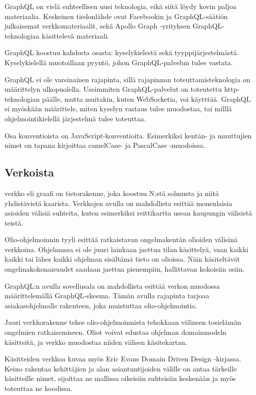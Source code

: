 GraphQL on vielä suhteellisen uusi teknologia, eikä siitä löydy kovin
paljoa materiaalia. Keskeinen tiedonlähde ovat Facebookin ja
GraphQL-säätiön julkaisemat verkkomateriaalit, sekä Apollo Graph
-yrityksen GraphQL-teknologiaa käsittelevä materiaali.

GraphQL koostuu kahdesta osasta: kyselykielestä sekä
tyyppijärjestelmästä. Kyselykielellä muotoillaan pyyntö, johon
GraphQL-palvelun tulee vastata.

GraphQL ei ole varsinainen rajapinta, sillä rajapinnan
toteuttamisteknologia on määrittelyn ulkopuolella. Useimmiten
GraphQL-palvelut on toteutettu \gls{http}-teknologian päälle, mutta
muitakin, kuten WebSocketia, voi käytttää. GraphQL ei myöskään
määrittele, miten kyselyn vastaus tulee muodostaa, tai milllä
ohjelmointikielellä järjestelmä tulee toteuttaa.

Osa konventioista on JavaScript-konventioita. Esimerkiksi kentän- ja
muuttujien nimet on tapana kirjoittaa camelCase- ja PascalCase
-muodoissa.\cite{GraphQLSchemaBasics}

\hypertarget{verkoista}{%
\subsection{Verkoista}\label{verkoista}}

\gls{verkko} eli graafi on tietorakenne, joka koostuu N:stä solmusta ja
niitä yhdistävistä kaarista.\cite{pozrikidis2014introduction} Verkkojen
avulla on mahdollista esittää monenlaisia asioiden välisiä suhteita,
kuten esimerkiksi reittikartta usean kaupungin välisistä teistä.

Olio-ohjelmoinnin tyyli esittää ratkaistavan ongelmakentän olioiden
välisinä verkkoina. Ohjelmassa ei ole juuri lainkaan jaettua tilan
käsittelyä, vaan kaikki kaikki tai lähes kaikki ohjelman sisältämä tieto
on olioissa. Näin käsiteltävät ongelmakokonaisuudet saadaan jaettua
pienempiin, hallittavan kokoisiin osiin. \cite{booch2008object}

GraphQL:n avulla sovellusala on mahdollista esittää verkon muodossa
määrittelemällä GraphQL-skeema. Tämän avulla rajapinta tarjoaa
asiakasohjelmalle rakenteen, joka muistuttaa
olio-ohjelmointia.\cite{thinkingInGraphs}

Juuri verkkorakenne tekee olio-ohjelmoinnista tehokkaan välineen
tosielämän ongelmien ratkaisemiseen. Oliot voivat edustaa ohjelman
\gls{domainmodel}n käsitteitä, ja verkko muodostaa niiden välisen
käsitekartan.

Käsitteiden verkkoa kuvaa myös Eric Evans Domain Driven Design
-kirjassa. Keino rakentaa  kehittäjien ja alan
asiantuntijoiden välille on antaa tärkeille käsitteille nimet, sijoittaa
ne mallissa oikeisiin suhteisiin keskenään ja myös toteuttaa ne
koodissa.

